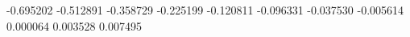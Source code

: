 -0.695202
-0.512891
-0.358729
-0.225199
-0.120811
-0.096331
-0.037530
-0.005614
0.000064
0.003528
0.007495
